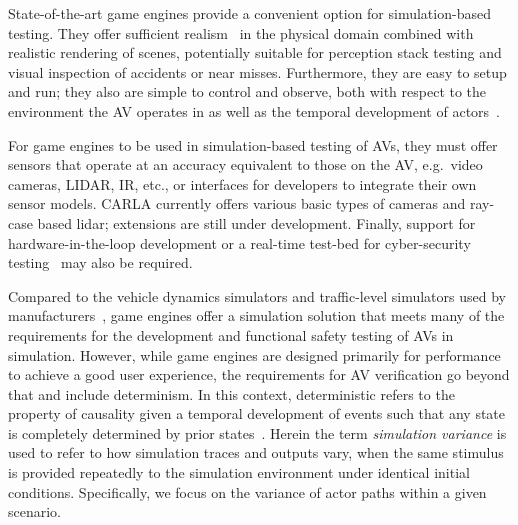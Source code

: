 \documentclass[letterpaper, 10 pt, journal, twoside]{IEEEtran}
\begin{document}
State-of-the-art game engines provide a convenient option for simulation-based testing. They offer sufficient realism~\cite{Koopman2018} in the physical domain combined with realistic rendering of scenes, potentially suitable for perception stack testing and visual inspection of accidents or near misses. 
%
Furthermore, they are easy to setup and run; they also are simple to control and observe, both with respect to the environment the AV operates in as well as the temporal development of actors~\cite{Ulbrich2015}. 
%

For game engines to be used in simulation-based testing of AVs, they must offer sensors that operate at an accuracy equivalent to those on the AV, e.g.\ video cameras, LIDAR, IR, etc., or interfaces for developers to integrate their own sensor models. CARLA currently offers various basic types of cameras and ray-case based lidar; extensions are still under development. 
%
Finally, support for hardware-in-the-loop development or a real-time test-bed for cyber-security testing~\cite{Javaid2013,cyres} may also be required. 
%

Compared to the vehicle dynamics simulators and traffic-level simulators used by manufacturers~\cite{FrameworkAndChallenges}, game engines offer a simulation solution that meets many of the requirements for the development and functional safety testing of AVs in simulation. 
%
%
However, while game engines are designed primarily for performance to achieve a good user experience, the requirements for AV verification go beyond that and include determinism.
%
In this context, deterministic refers to the property of causality given a temporal development of events such that any state is completely determined by prior states~\cite{Schumann2010}.
%
Herein the term \textit{simulation variance} is used to refer to how simulation traces and outputs vary, when the same stimulus is provided repeatedly to the simulation environment under identical initial conditions. Specifically, we focus on the variance of actor paths within a given scenario. 
\end{document}
